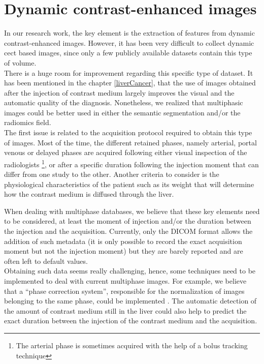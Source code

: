 \section{Dynamic contrast-enhanced images}

In our research work, the key element is the extraction of features
from dynamic contrast-enhanced images. However, it has been very
difficult to collect dynamic \ac{cect} based images, since only a few
publicly available datasets contain this type of volume. \\
There is a huge room for improvement regarding this specific type of
dataset. It has been mentioned in the chapter \ref{liverCancer}, that the
use of images obtained after the injection of contrast medium largely
improves the visual and the automatic quality of the diagnosis.
Nonetheless, we realized that multiphasic images could be better used in
either the semantic segmentation and/or the radiomics field.\\
The first issue is related to the acquisition protocol required to
obtain this type of images. Most of the time, the different retained
phases, namely arterial, portal venous or delayed phases are acquired
following either visual inspection of the radiologists \footnote{The arterial phase is sometimes acquired
with the help of a bolus tracking technique}, or after a specific
duration following the injection moment that can differ from one study
to the other. Another criteria to consider is the physiological
characteristics of the patient such as its weight that will determine
how the contrast medium is diffused through the liver.

When dealing with multiphase databases, we believe that these key
elements need to be considered, at least the moment of injection and/or
the duration between the injection and the acquisition.  
Currently, only the DICOM
format allows the addition of such metadata (it is only possible to record 
the exact acquisition moment but not the injection moment) 
but they are barely reported and
are often left to default values.\\
Obtaining such data seems really challenging, hence, some techniques
need to be implemented to deal with current multiphase images. 
For example, we believe that a ``phase correction system'', responsible for 
the normalization of images belonging to the same phase, could be
implemented . The automatic detection of the amount of contrast medium still in
the liver could also help to predict the exact duration between the
injection of the contrast medium and the acquisition.

